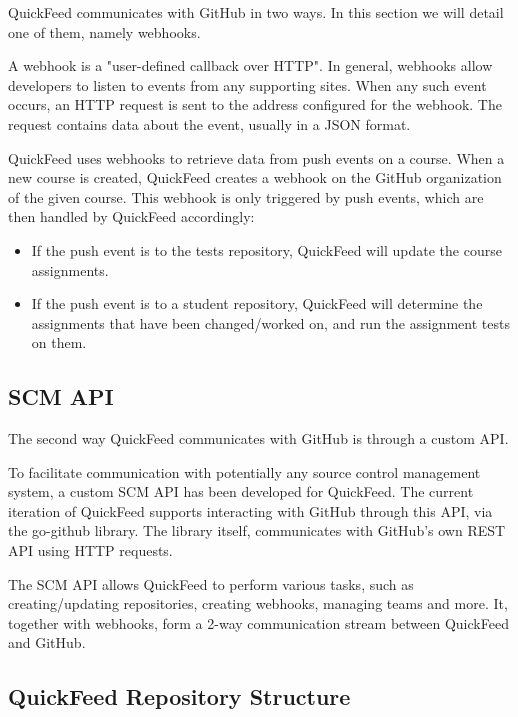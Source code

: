 QuickFeed communicates with GitHub in two ways.
In this section we will detail one of them, namely webhooks.

A webhook is a "user-defined callback over HTTP". %
In general, webhooks allow developers to listen to events from any supporting sites.
When any such event occurs, an HTTP request is sent to the address configured for the webhook.
The request contains data about the event, usually in a JSON format.

QuickFeed uses webhooks to retrieve data from push events on a course.
When a new course is created, QuickFeed creates a webhook on the GitHub organization of the given course.
This webhook is only triggered by push events, which are then handled by QuickFeed accordingly:

\begin{itemize}
    \item If the push event is to the tests repository, QuickFeed will update the course assignments.
    \item If the push event is to a student repository, QuickFeed will determine the assignments that have been changed/worked on, 
    and run the assignment tests on them.
\end{itemize}

\subsection{SCM API}
The second way QuickFeed communicates with GitHub is through a custom API.

To facilitate communication with potentially any source control management system, a custom SCM API has been developed for QuickFeed.
The current iteration of QuickFeed supports interacting with GitHub through this API, via the go-github library. %
The library itself, communicates with GitHub's own REST API using HTTP requests.

The SCM API allows QuickFeed to perform various tasks, such as creating/updating repositories, creating webhooks, managing teams and more.
It, together with webhooks, form a 2-way communication stream between QuickFeed and GitHub.

\subsection{QuickFeed Repository Structure}
\label{sec:quickfeed-repository-structure}

